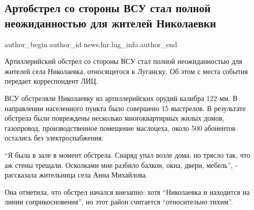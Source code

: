  
 
 
 
 
 
\subsection{Артобстрел со стороны ВСУ стал полной неожиданностью для жителей Николаевки}
\label{sec:17_02_2022.stz.news.lnr.lug_info.1.obstrel_nikolaevka}
 
\ifcmt
 author_begin
   author_id news.lnr.lug_info
 author_end
\fi

Артиллерийский обстрел со стороны ВСУ стал полной неожиданностью для жителей
села Николаевка, относящегося к Луганску. Об этом с места события передает
корреспондент ЛИЦ.


ВСУ обстреляли Николаевку из артиллерийских орудий калибра 122 мм. В
направлении населенного пункта было совершено 15 выстрелов. В результате
обстрела были повреждены несколько многоквартирных жилых домов, газопровод,
производственное помещение маслоцеха, около 500 абонентов остались без
электроснабжения.


\enquote{Я была в зале в момент обстрела. Снаряд упал возле дома, но трясло так, что аж
стены трещали. Осколками мне разбило балкон, окна, двери, мебель}, - рассказала
жительница села Анна Михайлова.


Она отметила, что обстрел начался внезапно: хотя \enquote{Николаевка и находится на
линии соприкосновения}, но этот район считается \enquote{относительно тихим}.



